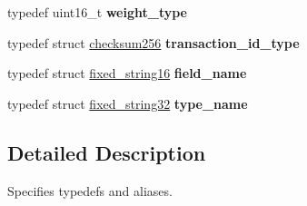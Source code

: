 \begin{DoxyCompactItemize}
typedef uint16\+\_\+t {\bfseries weight\+\_\+type}
\item 
\mbox{\label{group__types_gad40ea1265225083da2ae1a96d42f1a41}} 
typedef struct \mbox{\hyperlink{structchecksum256}{checksum256}} {\bfseries transaction\+\_\+id\+\_\+type}
\item 
\mbox{\label{group__types_ga8f1158e196e3e075955b5d2784b5e84a}} 
typedef struct \mbox{\hyperlink{structfixed__string16}{fixed\+\_\+string16}} {\bfseries field\+\_\+name}
\item 
\mbox{\label{group__types_ga0cd9ef7832cfdc4b69f91d2ce286de4c}} 
typedef struct \mbox{\hyperlink{structfixed__string32}{fixed\+\_\+string32}} {\bfseries type\+\_\+name}
\end{DoxyCompactItemize}


\subsection{Detailed Description}
Specifies typedefs and aliases. 

